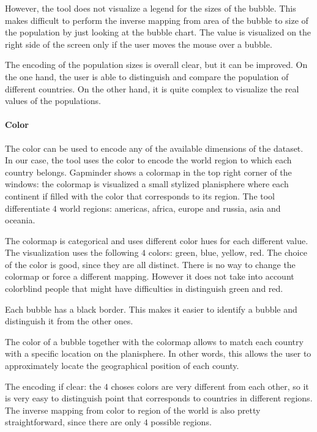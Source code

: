 However, the tool does not visualize a legend for the sizes of the bubble.
This makes difficult to perform the inverse mapping from area of the bubble to size of the population by just looking at the bubble chart.
The value is visualized on the right side of the screen only if the user moves the mouse over a bubble.

The encoding of the population sizes is overall clear, but it can be improved.
On the one hand, the user is able to distinguish and compare the population of different countries.
On the other hand, it is quite complex to visualize the real values of the populations.


\paragraph{Color}
\label{paragraph:bubbles-color}
The color can be used to encode any of the available dimensions of the dataset.
In our case, the tool uses the color to encode the world region to which each country belongs.
Gapminder shows a colormap in the top right corner of the windows:
the colormap is visualized a small stylized planisphere where each continent if filled with the color that corresponds to its region.
The tool differentiate $4$ world regions: americas, africa, europe and russia, asia and oceania.

The colormap is categorical and uses different color hues for each different value.
The visualization uses the following $4$ colors: green, blue, yellow, red.
The choice of the color is good, since they are all distinct.
There is no way to change the colormap or force a different mapping.
However it does not take into account colorblind people that might have difficulties in distinguish green and red.

Each bubble has a black border.
This makes it easier to identify a bubble and distinguish it from the other ones.

The color of a bubble together with the colormap allows to match each country with a specific location on the planisphere.
In other words, this allows the user to approximately locate the geographical position of each county.

The encoding if clear: the $4$ choses colors are very different from each other, so it is very easy to distinguish point that corresponds to countries in different regions.
The inverse mapping from color to region of the world is also pretty straightforward, since there are only $4$ possible regions.

